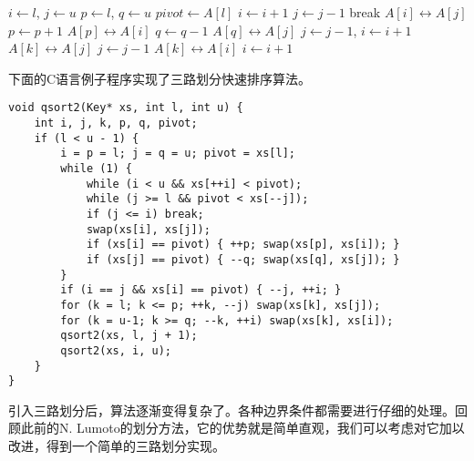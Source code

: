 \documentclass[UTF8]{article}
\begin{document}
\begin{algorithmic}[1]
    \State $i \gets l$, $j \gets u$
    \State $p \gets l$, $q \gets u$ 
    \State $pivot \gets A[l]$
    \Loop
      \Repeat
        \State $i \gets i + 1$
       
      \Repeat
        \State $j \gets j - 1$
       
        \State break 
      \EndIf
      \State {} $A[i] \leftrightarrow A[j]$
       
        \State $p \gets p + 1$
        \State {} $A[p] \leftrightarrow A[i]$
      \EndIf
        \State $q \gets q - 1$
        \State {} $A[q] \leftrightarrow A[j]$
      \EndIf
    \EndLoop
     
      \State $j \gets j - 1$, $i \gets i + 1$
    \EndIf
     
      \State {} $A[k] \leftrightarrow A[j]$
      \State $j \gets j - 1$
    \EndFor
      \State {} $A[k] \leftrightarrow A[i]$
      \State $i \gets i + 1$
    \EndFor
    \State {}
    \State {}
  \EndIf
\EndProcedure
\end{algorithmic}

下面的C语言例子程序实现了三路划分快速排序算法。

\lstset{language=C}
\begin{lstlisting}
void qsort2(Key* xs, int l, int u) {
    int i, j, k, p, q, pivot;
    if (l < u - 1) {
        i = p = l; j = q = u; pivot = xs[l];
        while (1) {
            while (i < u && xs[++i] < pivot);
            while (j >= l && pivot < xs[--j]);
            if (j <= i) break;
            swap(xs[i], xs[j]);
            if (xs[i] == pivot) { ++p; swap(xs[p], xs[i]); }
            if (xs[j] == pivot) { --q; swap(xs[q], xs[j]); }
        }
        if (i == j && xs[i] == pivot) { --j, ++i; }
        for (k = l; k <= p; ++k, --j) swap(xs[k], xs[j]);
        for (k = u-1; k >= q; --k, ++i) swap(xs[k], xs[i]);
        qsort2(xs, l, j + 1);
        qsort2(xs, i, u);
    }
}
\end{lstlisting}

引入三路划分后，算法逐渐变得复杂了。各种边界条件都需要进行仔细的处理。回顾此前的N. Lumoto的划分方法，它的优势就是简单直观，我们可以考虑对它加以改进，得到一个简单的三路划分实现。
\end{document}
